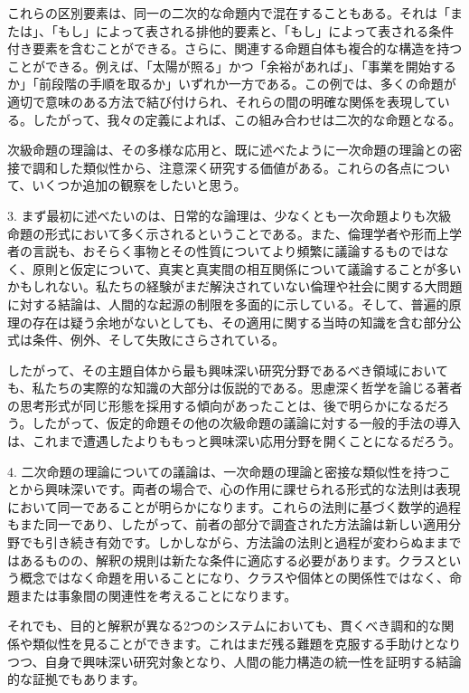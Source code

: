 \documentclass[a4paper,11pt,openany]{ltjsbook}
\begin{document}
これらの区別要素は、同一の二次的な命題内で混在することもある。それは「または」、「もし」によって表される排他的要素と、「もし」によって表される条件付き要素を含むことができる。さらに、関連する命題自体も複合的な構造を持つことができる。例えば、「太陽が照る」かつ「余裕があれば」、「事業を開始するか」「前段階の手順を取るか」いずれか一方である。この例では、多くの命題が適切で意味のある方法で結び付けられ、それらの間の明確な関係を表現している。したがって、我々の定義によれば、この組み合わせは二次的な命題となる。

次級命題の理論は、その多様な応用と、既に述べたように一次命題の理論との密接で調和した類似性から、注意深く研究する価値がある。これらの各点について、いくつか追加の観察をしたいと思う。

3. まず最初に述べたいのは、日常的な論理は、少なくとも一次命題よりも次級命題の形式において多く示されるということである。また、倫理学者や形而上学者の言説も、おそらく事物とその性質についてより頻繁に議論するものではなく、原則と仮定について、真実と真実間の相互関係について議論することが多いかもしれない。私たちの経験がまだ解決されていない倫理や社会に関する大問題に対する結論は、人間的な起源の制限を多面的に示している。そして、普遍的原理の存在は疑う余地がないとしても、その適用に関する当時の知識を含む部分公式は条件、例外、そして失敗にさらされている。

したがって、その主題自体から最も興味深い研究分野であるべき領域においても、私たちの実際的な知識の大部分は仮説的である。思慮深く哲学を論じる著者の思考形式が同じ形態を採用する傾向があったことは、後で明らかになるだろう。したがって、仮定的命題その他の次級命題の議論に対する一般的手法の導入は、これまで遭遇したよりももっと興味深い応用分野を開くことになるだろう。

4. 二次命題の理論についての議論は、一次命題の理論と密接な類似性を持つことから興味深いです。両者の場合で、心の作用に課せられる形式的な法則は表現において同一であることが明らかになります。これらの法則に基づく数学的過程もまた同一であり、したがって、前者の部分で調査された方法論は新しい適用分野でも引き続き有効です。しかしながら、方法論の法則と過程が変わらぬままではあるものの、解釈の規則は新たな条件に適応する必要があります。クラスという概念ではなく命題を用いることになり、クラスや個体との関係性ではなく、命題または事象間の関連性を考えることになります。

それでも、目的と解釈が異なる2つのシステムにおいても、貫くべき調和的な関係や類似性を見ることができます。これはまだ残る難題を克服する手助けとなりつつ、自身で興味深い研究対象となり、人間の能力構造の統一性を証明する結論的な証拠でもあります。
\end{document}
